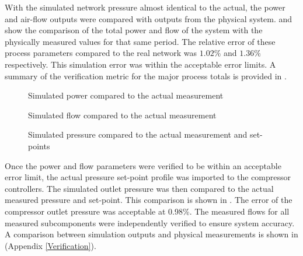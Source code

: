  With the simulated network pressure almost identical to the actual, the power and air-flow outputs were compared with outputs from the physical system.  and  show the comparison of the total power and flow of the system with the physically measured values for that same period. The relative error of these process parameters compared to the real network was $1.02 \%$ and $1.36 \%$ respectively. This simulation error was within the acceptable error limits. A summary of the  verification metric for the major process totals is provided in .
 \par
	\begin{figure}[h!]
		\centering
		
		\caption{Simulated power compared to the actual measurement}
		\label{fig: Verification Power kusasalethu}
	\end{figure}
	\begin{figure}[h!]
		\centering
		
		\caption{Simulated flow compared to the actual measurement}
		\label{fig: Verification Flow kusasalethu}
	\end{figure}
	 \begin{figure}[h!]
	 	\centering
	 	
	 	\caption{Simulated pressure compared to the actual measurement and  set-points}
	 	\label{fig: Verification Pressure kusasalethu Setpoint}
	 \end{figure}
	\clearpage
	Once the power and flow parameters were verified to be within an acceptable error limit, the actual pressure  set-point profile was imported to the compressor controllers. The simulated outlet pressure was then compared to the actual measured pressure and  set-point. This comparison is shown in . The error of the compressor outlet pressure was acceptable at 0.98\%. The measured flows for all measured subcomponents were independently verified to ensure system accuracy. A comparison between simulation outputs and physical measurements is shown in  (Appendix \ref{Verification}).	
	\\
